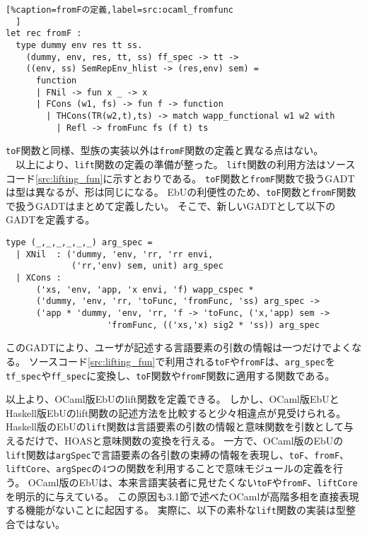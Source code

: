 \documentclass[uplatex]{sumiilab-paper}
\theoremstyle{mystyle}
\numberwithin{definition}{chapter} %
\begin{document}
\begin{lstlisting}[%caption=fromFの定義,label=src:ocaml_fromfunc
  ]
let rec fromF : 
  type dummy env res tt ss. 
    (dummy, env, res, tt, ss) ff_spec -> tt -> 
    ((env, ss) SemRepEnv_hlist -> (res,env) sem) = 
      function 
      | FNil -> fun x _ -> x 
      | FCons (w1, fs) -> fun f -> function 
        | THCons(TR(w2,t),ts) -> match wapp_functional w1 w2 with 
          | Refl -> fromFunc fs (f t) ts
\end{lstlisting}

{\tt toF}関数と同様、型族の実装以外は{\tt fromF}関数の定義と異なる点はない。\\
　以上により、{\tt lift}関数の定義の準備が整った。
{\tt lift}関数の利用方法はソースコード\ref{src:lifting_fun}に示すとおりである。
{\tt toF}関数と{\tt fromF}関数で扱うGADTは型は異なるが、形は同じになる。
EbUの利便性のため、{\tt toF}関数と{\tt fromF}関数で扱うGADTはまとめて定義したい。
そこで、新しいGADTとして以下のGADTを定義する。

\begin{lstlisting}[caption=arg\_specの定義,label=src:lift_arg_spec]
type (_,_,_,_,_,_) arg_spec =
  | XNil  : ('dummy, 'env, 'rr, 'rr envi, 
             ('rr,'env) sem, unit) arg_spec 
  | XCons : 
      ('xs, 'env, 'app, 'x envi, 'f) wapp_cspec * 
      ('dummy, 'env, 'rr, 'toFunc, 'fromFunc, 'ss) arg_spec -> 
      ('app * 'dummy, 'env, 'rr, 'f -> 'toFunc, ('x,'app) sem -> 
                    'fromFunc, (('xs,'x) sig2 * 'ss)) arg_spec
\end{lstlisting}

このGADTにより、ユーザが記述する言語要素の引数の情報は一つだけでよくなる。
ソースコード\ref{src:lifting_fun}で利用される{\tt toF}や{\tt fromF}は、{\tt arg\_spec}を{\tt tf\_spec}や{\tt ff\_spec}に変換し、{\tt toF}関数や{\tt fromF}関数に適用する関数である。

以上より、OCaml版EbUのlift関数を定義できる。
しかし、OCaml版EbUとHaskell版EbUのlift関数の記述方法を比較すると少々相違点が見受けられる。
Haskell版のEbUの{\tt lift}関数は言語要素の引数の情報と意味関数を引数として与えるだけで、HOASと意味関数の変換を行える。
一方で、OCaml版のEbUの{\tt lift}関数は{\tt argSpec}で言語要素の各引数の束縛の情報を表現し、{\tt toF}、{\tt fromF}、{\tt liftCore}、{\tt argSpec}の4つの関数を利用することで意味モジュールの定義を行う。
OCaml版のEbUは、本来言語実装者に見せたくない{\tt toF}や{\tt fromF}、{\tt liftCore}を明示的に与えている。
この原因も3.1節で述べたOCamlが高階多相を直接表現する機能がないことに起因する。
実際に、以下の素朴な{\tt lift}関数の実装は型整合ではない。
\end{document}
